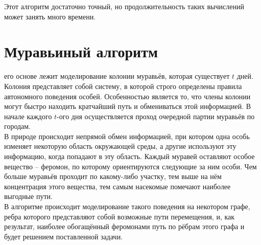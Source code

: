 Этот алгоритм достаточно точный, но продолжительность таких вычислений может занять много времени.\\

\section{Муравьиный алгоритм}
 его основе лежит моделирование колонии муравьёв, которая существует $t$ дней. Колония представляет собой систему, в которой строго определены правила автономного поведения особей. Особенностью является то, что члены колонии могут быстро находить кратчайший путь и обмениваться этой информацией. В начале каждого $t$-ого дня осуществляется проход очередной партии муравьёв по городам. \\

В природе происходит непрямой обмен информацией, при котором одна особь изменяет некоторую область окружающей среды, а другие используют эту информацию, когда попадают в эту область. Каждый муравей оставляют особое вещество -- феромон, по которому ориентируются следующие за ним особи. Чем больше муравьёв проходит по какому-либо участку, тем выше на нём концентрация этого вещества, тем самым насекомые помечают наиболее выгодные пути. \\

В алгоритме происходит моделирование такого поведения на некотором графе, ребра которого представляют собой возможные пути перемещения, и, как результат, наиболее обогащённый феромонами путь по рёбрам этого графа и будет решением поставленной задачи.\\

